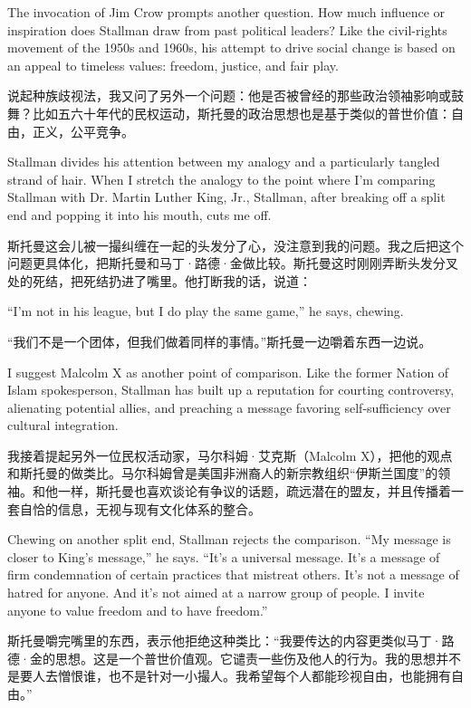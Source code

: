 \ifdefined\eng
The invocation of Jim Crow prompts another question. How much influence or inspiration does Stallman draw from past political leaders? Like the civil-rights movement of the 1950s and 1960s, his attempt to drive social change is based on an appeal to timeless values: freedom, justice, and fair play.
\fi

\ifdefined\chs
说起种族歧视法，我又问了另外一个问题：他是否被曾经的那些政治领袖影响或鼓舞？比如五六十年代的民权运动，斯托曼的政治思想也是基于类似的普世价值：自由，正义，公平竞争。
\fi

\ifdefined\eng
Stallman divides his attention between my analogy and a particularly tangled strand of hair. When I stretch the analogy to the point where I'm comparing Stallman with Dr. Martin Luther King, Jr., Stallman, after breaking off a split end and popping it into his mouth, cuts me off.
\fi

\ifdefined\chs
斯托曼这会儿被一撮纠缠在一起的头发分了心，没注意到我的问题。我之后把这个问题更具体化，把斯托曼和马丁·路德·金做比较。斯托曼这时刚刚弄断头发分叉处的死结，把死结扔进了嘴里。他打断我的话，说道：
\fi

\ifdefined\eng
``I'm not in his league, but I do play the same game,'' he says, chewing.
\fi

\ifdefined\chs
``我们不是一个团体，但我们做着同样的事情。''斯托曼一边嚼着东西一边说。
\fi

\ifdefined\eng
I suggest Malcolm X as another point of comparison. Like the former Nation of Islam spokesperson, Stallman has built up a reputation for courting controversy, alienating potential allies, and preaching a message favoring self-sufficiency over cultural integration.
\fi

\ifdefined\chs
我接着提起另外一位民权活动家，马尔科姆·艾克斯（Malcolm X），把他的观点和斯托曼的做类比。马尔科姆曾是美国非洲裔人的新宗教组织``伊斯兰国度''的领袖。和他一样，斯托曼也喜欢谈论有争议的话题，疏远潜在的盟友，并且传播着一套自恰的信息，无视与现有文化体系的整合。
\fi

\ifdefined\eng
Chewing on another split end, Stallman rejects the comparison. ``My message is closer to King's message,'' he says. ``It's a universal message. It's a message of firm condemnation of certain practices that mistreat others. It's not a message of hatred for anyone. And it's not aimed at a narrow group of people. I invite anyone to value freedom and to have freedom.''
\fi

\ifdefined\chs
斯托曼嚼完嘴里的东西，表示他拒绝这种类比：``我要传达的内容更类似马丁·路德·金的思想。这是一个普世价值观。它谴责一些伤及他人的行为。我的思想并不是要人去憎恨谁，也不是针对一小撮人。我希望每个人都能珍视自由，也能拥有自由。''
\fi

